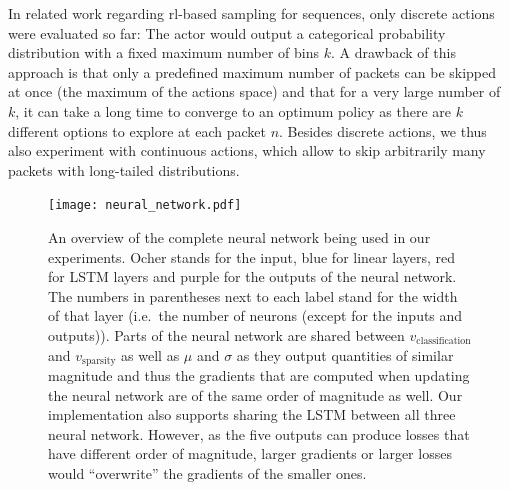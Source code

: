\documentclass[conference]{IEEEtran}
\newcommand\note[2]{{\color{#1}#2}}
\begin{document}

In related work regarding \gls{rl}-based sampling for sequences, only discrete actions were evaluated so far: The actor would output a categorical probability distribution with a fixed maximum number of bins $k$. A drawback of this approach is that only a predefined maximum number of packets can be skipped at once (the maximum of the actions space) and that for a very large number of $k$, it can take a long time to converge to an optimum policy as there are $k$ different options to explore at each packet $n$. Besides discrete actions, we thus also experiment with continuous actions, which allow to skip arbitrarily many packets with long-tailed distributions.

\begin{figure}
\centering
  \texttt{[image: neural\_network.pdf]}
  \caption{An overview of the complete neural network being used in our experiments. Ocher stands for the input, blue for linear layers, red for LSTM layers and purple for the outputs of the neural network. The numbers in parentheses next to each label stand for the width of that layer (i.e.~the number of neurons (except for the inputs and outputs)). Parts of the neural network are shared between $v_\text{classification}$ and $v_\text{sparsity}$ as well as $\mu$ and $\sigma$ as they output quantities of similar magnitude and thus the gradients that are computed when updating the neural network are of the same order of magnitude as well. Our implementation also supports sharing the LSTM between all three neural network. However, as the five outputs can produce losses that have different order of magnitude, larger gradients or larger losses would ``overwrite'' the gradients of the smaller ones.}
  \label{fig:neuralNetworkArchitecture}
\end{figure}

\end{document}
